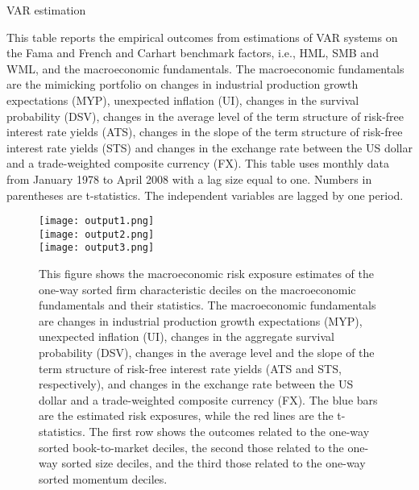 \documentclass[12pt,a4paper]{ouparticle}
\begin{document}
\begin{sidewaystable}
  \begin{threeparttable}
    \caption{VAR estimation}
    
    \begin{tablenotes} 
    \small 
    \item This table reports the empirical outcomes from estimations of VAR systems on the Fama and French and Carhart benchmark factors, i.e., HML, SMB and WML, and the macroeconomic fundamentals. The macroeconomic fundamentals are the mimicking portfolio on changes in industrial production growth expectations (MYP), unexpected inflation (UI), changes in the survival probability (DSV), changes in the average level of the term structure of risk-free interest rate yields (ATS), changes in the slope of the term structure of risk-free interest rate yields (STS) and changes in the exchange rate between the US dollar and a trade-weighted composite currency (FX). This table uses monthly data from January 1978 to April 2008 with a lag size equal to one. Numbers in parentheses are t-statistics.
    The independent variables are lagged by one period.
    \end{tablenotes}
  \end{threeparttable}
\end{sidewaystable}


\begin{figure}
\centering
    \texttt{[image: output1.png]}\\
    \texttt{[image: output2.png]}\\
    \texttt{[image: output3.png]}
  \caption{This figure shows the macroeconomic risk exposure estimates of the one-way sorted firm characteristic deciles on the macroeconomic fundamentals and their statistics. The macroeconomic fundamentals are changes in industrial production growth expectations (MYP), unexpected inflation (UI), changes in the aggregate survival probability (DSV), changes in the average level and the slope of the term structure of risk-free interest rate yields (ATS and STS, respectively), and changes in the exchange rate between the US dollar and a trade-weighted composite currency (FX). The blue bars are the estimated risk exposures, while the red lines are the t-statistics. The first row shows the outcomes related to the one-way sorted book-to-market deciles, the second those related to the one-way sorted size deciles, and the third those related to the one-way sorted momentum deciles.}
\end{figure}
\end{document}
